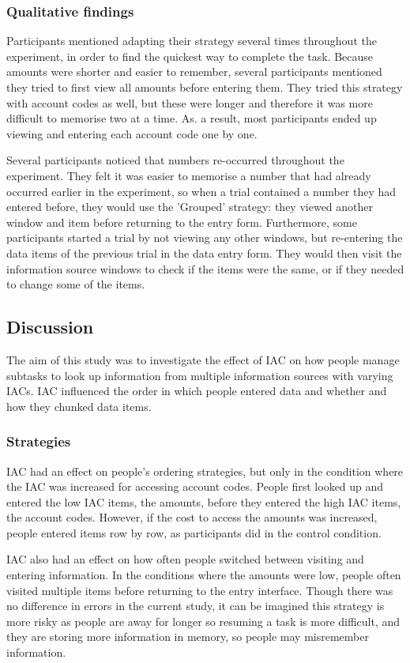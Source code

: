 \begin{table}
\begin{enumerate}
\subsubsection{Qualitative findings}
Participants mentioned adapting their strategy several times throughout the experiment, in order to find the quickest way to complete the task. Because amounts were shorter and easier to remember, several participants mentioned they tried to first view all amounts before entering them. They tried this strategy with account codes as well, but these were longer and therefore it was more difficult to memorise two at a time. As. a result, most participants ended up viewing and entering each account code one by one.

Several participants noticed that numbers re-occurred throughout the experiment. They felt it was easier to memorise a number that had already occurred earlier in the experiment, so when a trial contained a number they had entered before, they would use the 'Grouped' strategy: they viewed another window and item before returning to the entry form. Furthermore, some participants started a trial by not viewing any other windows, but re-entering the data items of the previous trial in the data entry form. They would then visit the information source windows to check if the items were the same, or if they needed to change some of the items.

\subsection{Discussion}
The aim of this study was to investigate the effect of IAC on how people manage subtasks to look up information from multiple information sources with varying IACs. IAC influenced the order in which people entered data and whether and how they chunked data items.

\subsubsection{Strategies}
IAC had an effect on people's ordering strategies, but only in the condition where the IAC was increased for accessing account codes. People first looked up and entered the low IAC items, the amounts, before they entered the high IAC items, the account codes. However, if the cost to access the amounts was increased, people entered items row by row, as participants did in the control condition.

IAC also had an effect on how often people switched between visiting and entering information. In the conditions where the amounts were low, people often visited multiple items before returning to the entry interface. Though there was no difference in errors in the current study, it can be imagined this strategy is more risky as people are away for longer so resuming a task is more difficult, and they are storing more information in memory, so people may misremember information.


\end{enumerate}
\end{table}
